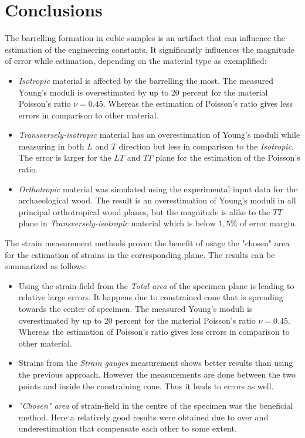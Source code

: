 \documentclass[review]{elsarticle}
\begin{document}
\section{Conclusions}

The barrelling formation in cubic samples is an artifact that can influence the
estimation of the engineering constants. It significantly influences the
magnitude of error while estimation, depending on the material type as
exemplified:

\begin{itemize}
  \item \textit{Isotropic} material is affected by the barrelling the most.
  The measured Young's moduli is overestimated by up to 20 percent for the
  material Poisson's ratio $\nu=0.45$. Whereas the estimation of Poisson's ratio
  gives less errors in comparison to other material.
  \item \textit{Transversely-isotropic} material has an overestimation of Young's moduli while measuring in both $L$ and $T$ direction but less in comparison to the \textit{Isotropic}. The error is larger for the $LT$  and $TT$ plane for the estimation of the Poisson's ratio. 
  \item \textit{Orthotropic} material was simulated using the experimental input data for the archaeological wood. The result is an overestimation of Young's moduli in all principal orthotropical wood planes, but the magnitude is alike to the $TT$ plane in \textit{Transversely-isotropic} material which is below $1,5\%$ of error margin.
\end{itemize}

The strain measurement methods proven the benefit of usage the "chosen" area for the estimation of strains in the corresponding plane. The results can be summarized as follows: 

\begin{itemize}
  \item Using the strain-field from the \textit{Total area} of the specimen plane is leading to relative large errors. It happens due to constrained cone that is spreading towards the center  of specimen.  
  The measured Young's moduli is overestimated by up to 20 percent for the
  material Poisson's ratio $\nu=0.45$. Whereas the estimation of Poisson's ratio
  gives less errors in comparison to other material.
  \item Strains from the \textit{Strain gauges} measurement shows better results than using the previous approach. However the measurements are done between the two points and inside the constraining cone. Thus it leads to errors as well.
  \item  \textit{"Chosen" area} of strain-field in the centre of the specimen was the beneficial method. Here a relatively good results were obtained due to over and underestimation that compensate each other to some extent.
\end{itemize}
\end{document}

